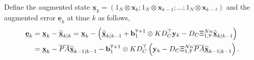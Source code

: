 \documentclass[journal]{IEEEtran}
\def\mb{\mathbf}
\begin{document}
\begin{strip}
Define the augmented state  $\underline{\mb{x}}_{k} = \left(1_{N} \otimes   \mb{x}_k; 1_{N} \otimes \mb{x}_{k-1}; \dots; 1_{N} \otimes \mb{x}_{k-\overline{\tau}} \right) $ and the augmented error $\underline{\mb{e}}_{k}$ at time $k$ as follows,
\begin{align} 
	\underline{\mb{e}}_{k}  &= \underline{\mb{x}}_{k} - \underline{\widehat{\mb{x}}}_{k|k}  =\underline{\mb{x}}_{k} - \Bigl(\underline{\widehat{\mb{x}}}_{k|k-1} + \mb{b}^{\overline{\tau}+1}_1 \otimes K D_C^\top \mb{y}_k-D_C\Xi^{Nn}_{1,\overline{\tau}}\underline{\widehat{\mb{x}}}_{k|k-1}\Bigr) \nonumber
	\\
	&= \underline{\mb{x}}_{k}  - \overline{PA}\underline{\widehat{\mb{x}}}_{k-1|k-1} - \mb{b}^{\overline{\tau}+1}_1 \otimes K D_C^\top \left(\mb{y}_k-D_C\Xi^{Nn}_{1,\overline{\tau}}\overline{PA} \underline{\widehat{\mb{x}}}_{k-1|k-1}\right). \label{eq_love}
\end{align}


\end{strip}
\end{document}
